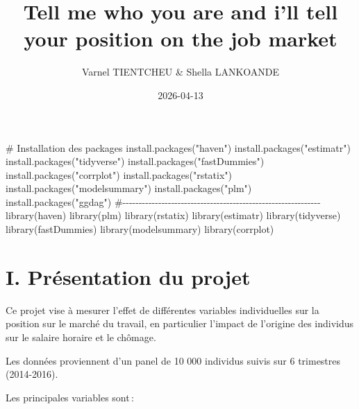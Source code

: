 \documentclass[
  letterpaper,
  DIV=11,
  numbers=noendperiod]{scrartcl}
\title{Tell me who you are and i'll tell your position on the job
market}
\author{Varnel TIENTCHEU \& Shella LANKOANDE}
\date{2026-04-13}
\newenvironment{Shaded}{\begin{snugshade}}{\end{snugshade}}
\newcommand{\CommentTok}[1]{\textcolor[rgb]{0.37,0.37,0.37}{#1}}
\newcommand{\FunctionTok}[1]{\textcolor[rgb]{0.28,0.35,0.67}{#1}}
\newcommand{\NormalTok}[1]{\textcolor[rgb]{0.00,0.23,0.31}{#1}}
\newcommand{\StringTok}[1]{\textcolor[rgb]{0.13,0.47,0.30}{#1}}
\renewcommand*\contentsname{Table of contents}
\newcommand\contentsname{Table of contents}
\begin{document}
\maketitle

\renewcommand*\contentsname{Table of contents}
{
\hypersetup{linkcolor=}
\setcounter{tocdepth}{3}
\tableofcontents
}

\begin{Shaded}
\begin{Highlighting}[]
\CommentTok{\# Installation des packages}
\FunctionTok{install.packages}\NormalTok{(}\StringTok{"haven"}\NormalTok{)}
\FunctionTok{install.packages}\NormalTok{(}\StringTok{"estimatr"}\NormalTok{)}
\FunctionTok{install.packages}\NormalTok{(}\StringTok{"tidyverse"}\NormalTok{)}
\FunctionTok{install.packages}\NormalTok{(}\StringTok{"fastDummies"}\NormalTok{)}
\FunctionTok{install.packages}\NormalTok{(}\StringTok{"corrplot"}\NormalTok{)}
\FunctionTok{install.packages}\NormalTok{(}\StringTok{"rstatix"}\NormalTok{)}
\FunctionTok{install.packages}\NormalTok{(}\StringTok{"modelsummary"}\NormalTok{)}
\FunctionTok{install.packages}\NormalTok{(}\StringTok{"plm"}\NormalTok{)}
\FunctionTok{install.packages}\NormalTok{(}\StringTok{"ggdag"}\NormalTok{)}
\CommentTok{\#{-}{-}{-}{-}{-}{-}{-}{-}{-}{-}{-}{-}{-}{-}{-}{-}{-}{-}{-}{-}{-}{-}{-}{-}{-}{-}{-}{-}{-}{-}{-}{-}{-}{-}{-}{-}{-}{-}{-}{-}{-}{-}{-}{-}{-}{-}{-}{-}{-}{-}{-}{-}{-}{-}{-}{-}{-}{-}{-}{-}{-}}
\FunctionTok{library}\NormalTok{(haven) }
\FunctionTok{library}\NormalTok{(plm)}
\FunctionTok{library}\NormalTok{(rstatix)}
\FunctionTok{library}\NormalTok{(estimatr)}
\FunctionTok{library}\NormalTok{(tidyverse)}
\FunctionTok{library}\NormalTok{(fastDummies)}
\FunctionTok{library}\NormalTok{(modelsummary)}
\FunctionTok{library}\NormalTok{(corrplot)}
\end{Highlighting}
\end{Shaded}

\section{I. Présentation du projet}\label{i.-pruxe9sentation-du-projet}

Ce projet vise à mesurer l'effet de différentes variables individuelles
sur la position sur le marché du travail, en particulier l'impact de
l'origine des individus sur le salaire horaire et le chômage.

Les données proviennent d'un panel de 10 000 individus suivis sur 6
trimestres (2014-2016).

Les principales variables sont\,:
\end{document}
